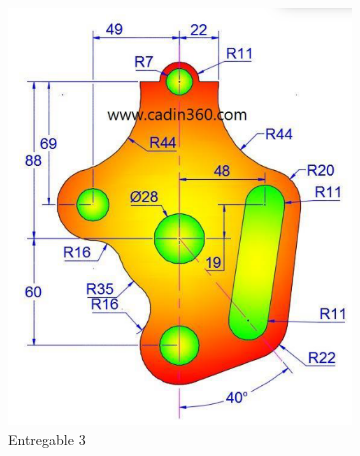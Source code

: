 \documentclass[letterpaper,pdftex]{article}
\begin{document}
\begin{figure}[h]
     \centering
     \begin{subfigure}[b]{0.45\textwidth}
         \centering
         \includegraphics[width=\textwidth]{task3}
         \caption{Entregable 3}
         \label{fig:der3}
     \end{subfigure}
     \hfill
     \begin{subfigure}[b]{0.45\textwidth}
         \centering

\end{subfigure}
\end{figure}
\end{document}
